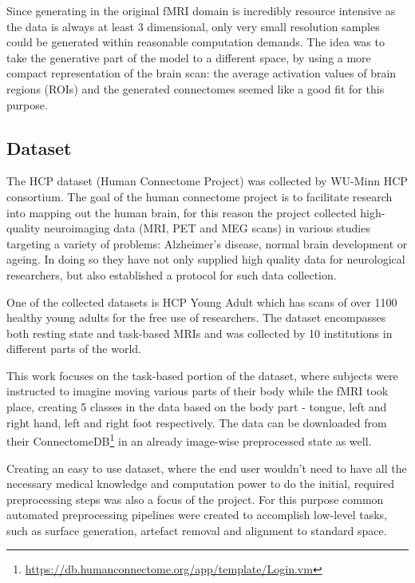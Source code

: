 	
	Since generating in the original fMRI domain is incredibly resource intensive as the data is always at least 3 dimensional, only very small resolution samples could be generated within reasonable computation demands. The idea was to take the generative part of the model to a different space, by using a more compact representation of the brain scan: the average activation values of brain regions (ROIs) and the generated connectomes seemed like a good fit for this purpose.

	\subsection{Dataset}
	\label{sec:HCP}
	
	The HCP dataset (Human Connectome Project) was collected by WU-Minn HCP consortium. The goal of the human connectome project is to facilitate research into mapping	out the human brain, for this reason the project collected high-quality neuroimaging data (MRI, PET and MEG scans) in various studies targeting a variety of problems: Alzheimer's disease, normal brain development or ageing. In doing so they have not only supplied high quality data for neurological researchers, but also established a protocol for such data collection\cite{van2012human}.
	
	One of the collected datasets is HCP Young Adult which has scans of over 1100 healthy young adults for the free use of researchers. The dataset encompasses both resting state and task-based MRIs and was collected by 10 institutions in different parts of the world. 
	
	This work focuses on the task-based portion of the dataset, where subjects were instructed to imagine moving various parts of their body while the fMRI took place, creating 5 classes in the data based on the body part - tongue, left and right hand, left and right foot respectively. The data can be downloaded from their ConnectomeDB\footnote{\url{https://db.humanconnectome.org/app/template/Login.vm}} in an already image-wise preprocessed state as well. 
	
	Creating an easy to use dataset, where the end user wouldn’t need to have all the necessary medical knowledge and computation power to do the initial, required preprocessing steps was also a focus of the project. For this purpose common automated preprocessing pipelines were created to accomplish low-level tasks, such as surface generation, artefact removal and alignment to standard space\cite{glasser2013minimal}.
	
